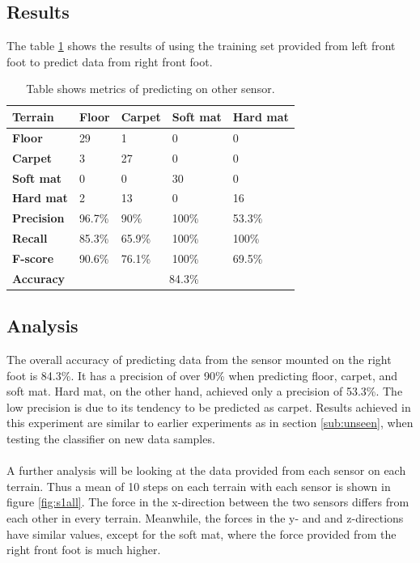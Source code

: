 \documentclass[USenglish]{ifimaster}  %
\begin{document}
\subsection{Results} 
The table \ref{tab:pred} shows the results of using the training set provided from left front foot to predict data from right front foot.
\begin{table}[h]
	\centering
	\begin{tabular}{lllll}
		\hline
		\textbf{Terrain} & \textbf{Floor} & \textbf{Carpet} & \textbf{Soft mat} & \textbf{Hard mat} \\ \hline
		\textbf{Floor} & \cellcolor[HTML]{FFFFC7}29 & 1 & 0 & 0 \\
		\textbf{Carpet} & 3 & \cellcolor[HTML]{FFFFC7}27 & 0 & 0 \\
		\textbf{Soft mat} & 0 & 0 & \cellcolor[HTML]{FFFFC7}30 & 0 \\
		\textbf{Hard mat} & 2 & 13 & 0 & \cellcolor[HTML]{FFFFC7}16 \\ \hline
		\textbf{Precision} & 96.7\% & 90\% & 100\% & 53.3\% \\
		\textbf{Recall} & 85.3\% & 65.9\% & 100\% & 100\% \\
		\textbf{F-score} & 90.6\% & 76.1\% & 100\% & 69.5\% \\ \hline
		\textbf{Accuracy} & \multicolumn{4}{c}{84.3\%} \\ \hline
	\end{tabular}
	\caption{Table shows metrics of predicting on other sensor.}
	\label{tab:pred}
\end{table}
	\FloatBarrier
	
\subsection{Analysis} 	
The overall accuracy of predicting data from the sensor mounted on the right foot is 84.3\%. It has a precision of over 90\% when predicting floor, carpet, and  soft mat. Hard mat, on the other hand, achieved only a precision of 53.3\%. The low precision is due to its tendency to be predicted as carpet. Results achieved in this experiment are similar to earlier experiments as in section \ref{sub:unseen}, when testing the classifier on new data samples. 
\\
\\
A further analysis will be looking at the data provided from each sensor on each terrain. Thus a mean of 10 steps on each terrain with each sensor is shown in figure \ref{fig:s1all}. The force in the x-direction between the two sensors differs from each other in every terrain. Meanwhile, the forces in the y- and and z-directions have similar values, except for the soft mat, where the force provided from the right front foot is much higher.
\end{document}
